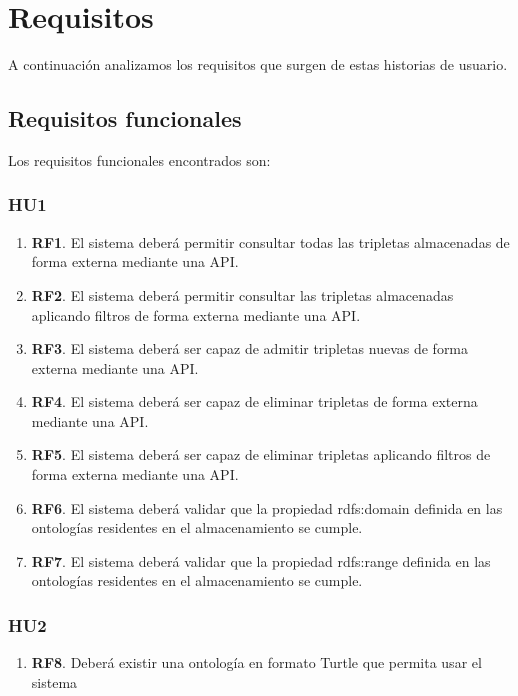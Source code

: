 \documentclass[openright,twoside,12pt]{book}
\begin{document}
\section{Requisitos}

A continuación analizamos los requisitos que surgen de estas historias de usuario.

\subsection{Requisitos funcionales}

Los requisitos funcionales encontrados son:

\subsubsection{HU1}
\begin{enumerate}
    \item\textbf{RF1}. El sistema deberá permitir consultar todas las tripletas almacenadas de forma externa mediante una API.
    \item\textbf{RF2}. El sistema deberá permitir consultar las tripletas almacenadas aplicando filtros de forma externa mediante una API.
    \item\textbf{RF3}. El sistema deberá ser capaz de admitir tripletas nuevas de forma externa mediante una API.
    \item\textbf{RF4}. El sistema deberá ser capaz de eliminar tripletas de forma externa mediante una API.
    \item\textbf{RF5}. El sistema deberá ser capaz de eliminar tripletas aplicando filtros de forma externa mediante una API.
    \item\textbf{RF6}. El sistema deberá validar que la propiedad rdfs:domain definida en las ontologías residentes en el almacenamiento se cumple.
    \item\textbf{RF7}. El sistema deberá validar que la propiedad rdfs:range definida en las ontologías residentes en el almacenamiento se cumple.
\end{enumerate}

\subsubsection{HU2}
\begin{enumerate}
    \item\textbf{RF8}. Deberá existir una ontología en formato Turtle que permita usar el sistema 
\end{enumerate}
\end{document}
